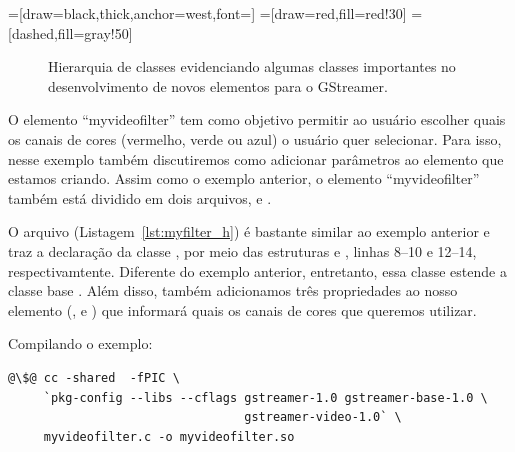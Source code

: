 =[draw=black,thick,anchor=west,font=\scriptsize]
=[draw=red,fill=red!30]
=[dashed,fill=gray!50]
\begin{figure}[H]
  \centering
  \label{fig:plugins_base_classes}
  \caption{Hierarquia de classes evidenciando algumas classes importantes no
           desenvolvimento de novos elementos para o GStreamer.}
\end{figure}

O elemento ``myvideofilter'' tem como objetivo permitir ao usuário escolher
quais os canais de cores (vermelho, verde ou azul) o usuário quer selecionar.
Para isso, nesse exemplo também discutiremos como adicionar parâmetros ao
elemento que estamos criando.  Assim como o exemplo anterior, o elemento
``myvideofilter'' também está dividido em dois arquivos,  e
.

O arquivo  (Listagem~\ref{lst:myfilter_h}) é bastante
similar ao exemplo anterior e traz a declaração da classe ,
por meio das estruturas  e ,
linhas 8--10 e 12--14, respectivamtente.  Diferente do exemplo anterior,
entretanto, essa classe estende a classe base .  Além disso,
também adicionamos três propriedades ao nosso elemento (,  e
) que informará quais os canais de cores que queremos utilizar.





Compilando o exemplo:
\begin{lstlisting}[style=command]
@\$@ cc -shared  -fPIC \
     `pkg-config --libs --cflags gstreamer-1.0 gstreamer-base-1.0 \
                                 gstreamer-video-1.0` \
     myvideofilter.c -o myvideofilter.so
\end{lstlisting}

